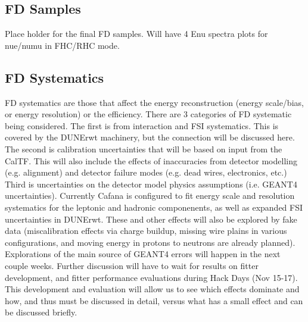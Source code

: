 \subsection{FD Samples}

Place holder for the final FD samples. Will have 4 Enu spectra plots for nue/numu in FHC/RHC mode.

\subsection{FD Systematics}
FD systematics are those that affect the energy reconstruction (energy scale/bias, or energy resolution) or the efficiency. There are 3 categories of FD systematic being considered. The first is from interaction and FSI systematics. This is covered by the DUNErwt machinery, but the connection will be discussed here. The second is calibration uncertainties that will be based on input from the CalTF. This will also include the effects of inaccuracies from detector modelling (e.g. alignment) and detector failure modes (e.g. dead wires, electronics, etc.) Third is uncertainties on the detector model physics assumptions (i.e. GEANT4 uncertainties).  Currently Cafana is configured to fit energy scale and resolution systematics for the leptonic and hadronic componenents, as well as expanded FSI uncertainties in DUNErwt. These and other effects will also be explored by fake data (miscalibration effects via charge buildup, missing wire plains in various configurations, and moving energy in protons to neutrons are already planned). Explorations of the main source of GEANT4 errors will happen in the next couple weeks. Further discussion will have to wait for results on fitter development, and fitter performance evaluations during
Hack Days (Nov 15-17). This development and evaluation will allow us to see which effects dominate and how, and thus must be discussed in detail, versus what has a small effect and can be discussed briefly.




